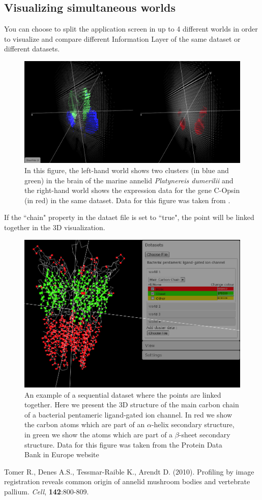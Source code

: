 \documentclass{bioinfo}
\begin{document}
\subsection{Visualizing simultaneous worlds}
You can choose to split the application screen in up to 4 different worlds in order to visualize and compare different Information Layer of the same dataset or different datasets. 
\begin{figure}[h!]%
\centerline{\includegraphics[totalheight=0.19\textheight]{Supp_fig1.png}}
\caption{In this figure, the left-hand world shows two clusters (in blue and green) in the brain of the marine annelid {\it Platynereis dumerilii} and the right-hand world shows the expression data for the gene C-Opsin (in red) in the same dataset. Data for this figure was taken from \citep{Tomer10}.}\label{fig:01}
\end{figure}
If the ``chain" property in the dataet file is set to ``true", the point will be linked together in the 3D visualization.
\begin{figure}[h!]%
\centerline{\includegraphics[totalheight=0.2\textheight]{Supp_fig2.png}}
\caption{An example of a sequential dataset where the points are linked together. Here we present the 3D structure of the main carbon chain of a bacterial pentameric ligand-gated ion channel. In red we show the carbon atoms which are part of an $\alpha$-helix secondary structure, in green we show the atoms which are part of a $\beta$-sheet secondary structure. Data for this figure was taken from the Protein Data Bank in Europe website}\label{fig:02}
\end{figure}
\begin{thebibliography}{}
 Tomer R., Denes A.S., Tessmar-Raible K., Arendt D. (2010). Profiling by image registration reveals common origin of annelid mushroom bodies and vertebrate pallium. {\it{Cell}}, {\bf{142}}:800-809. 
\end{thebibliography}
\end{document}
